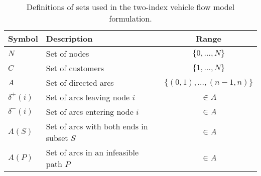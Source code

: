 \begin{table}[ht]
	\centering
	\begin{tabular}{llc}
		\toprule
		Symbol        & Description                              & Range                         \\
		\midrule
		$N$           & Set of nodes                             & $\{ 0, \dots, N \}$           \\
		$C$           & Set of customers                         & $\{ 1, \dots, N \} $          \\
		$A$           & Set of directed arcs                     & $\{(0,1), \dots, (n-1, n) \}$ \\
		$\delta^+(i)$ & Set of arcs leaving node $i$             & $\in A$                       \\
		$\delta^-(i)$ & Set of arcs entering node $i$            & $\in A$                       \\
		$A(S)$        & Set of arcs with both ends in subset $S$ & $\in A$                       \\
		$A(P)$        & Set of arcs in an infeasible path $P$    & $\in A$                       \\
		\bottomrule
	\end{tabular}
	\caption{Definitions of sets used in the two-index vehicle flow model formulation.}
	\label{tab:set_definitions}
\end{table}
\clearpage
